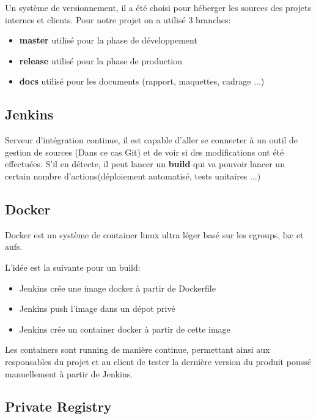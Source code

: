 \documentclass [a4paper,11pt]{article}
\begin{document}
Un système de versionnement, il a été choisi pour héberger les sources des projets internes et clients. Pour notre projet on a utilisé 3 branches:\newline

\begin{itemize}
 \item \textbf{master} utilisé pour la phase de développement
 \item \textbf{release} utilisé pour la phase de production
 \item \textbf{docs} utilisé pour les documents (rapport, maquettes, cadrage ...)
\end{itemize}

\subsection{Jenkins}

Serveur d'intégration continue, il est capable d’aller se connecter à un outil de gestion de sources (Dans ce cas Git) et de voir si des modifications ont été effectuées. S’il en détecte, il peut lancer un \textbf{build} qui va pouvoir lancer un certain nombre d’actions(déploiement automatisé, tests unitaires ...)

\subsection{Docker}

Docker est un système de container linux ultra léger basé sur les cgroups, lxc et aufs.\newline

L'idée est la suivante pour un build:\newline

\begin{itemize}
 \item Jenkins crée une image docker à partir de Dockerfile
 \item Jenkins push l'image dans un dépot privé
 \item Jenkins crée un container docker à partir de cette image\newline
\end{itemize}
\newline
Les containers sont running de manière continue, permettant ainsi aux responsables du projet et au client de tester la dernière version du produit poussé manuellement à partir de Jenkins.

\subsection{Private Registry}
\end{document}
